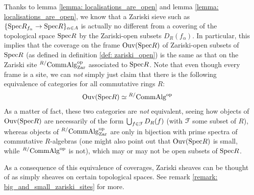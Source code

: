                     \begin{corollary} \label{coro: zariski_frames_and_sites}
                        Thanks to lemma \ref{lemma: localisations_are_open} and lemma \ref{lemma: localisations_are_open}, we know that a Zariski sieve such as $\{\mathrm{Spec} R_{f_{\alpha}} \to \mathrm{Spec} R\}_{\alpha \in A}$ is actually no different from a covering of the topological space $\mathrm{Spec} R$ by the Zariski-open subsets $D_R(f_{\alpha})$. In particular, this implies that the coverage on the frame $\mathrm{Ouv}(\mathrm{Spec} R)$ of Zariski-open subsets of $\mathrm{Spec} R$ (as defined in definition \ref{def: zariski_open}) is the same as that on the Zariski site ${}^{R/}\mathrm{Comm}\mathrm{Alg}_{\mathrm{Zar}}^{\mathrm{op}}$ associated to $\mathrm{Spec} R$. Note that even though every frame is a site, we can \textit{not} simply just claim that there is the following equivalence of categories for all commutative rings $R$:
                            $$\mathrm{Ouv}(\mathrm{Spec} R) \simeq {}^{R/}\mathrm{Comm}\mathrm{Alg}^{\mathrm{op}}$$
                        As a matter of fact, these two categories are \textit{not} equivalent, seeing how objects of $\mathrm{Ouv}(\mathrm{Spec} R)$ are necessarily of the form $\bigcup_{f \in \mathcal{F}} D_R(f)$ (with $\mathcal{F}$ some subset of $R$), whereas objects of ${}^{R/}\mathrm{Comm}\mathrm{Alg}_{\mathrm{Zar}}^{\mathrm{op}}$ are only in bijection with prime spectra of commutative $R$-algebras (one might also point out that $\mathrm{Ouv}(\mathrm{Spec} R)$ is small, while ${}^{R/}\mathrm{Comm}\mathrm{Alg}^{\mathrm{op}}$ is not), which may or may not be open subsets of $\mathrm{Spec} R$. 
                        
                        As a consequence of this equivalence of coverages, Zariski sheaves can be thought of as simply sheaves on certain topological spaces. See remark \ref{remark: big_and_small_zariski_sites} for more.
                    \end{corollary}

